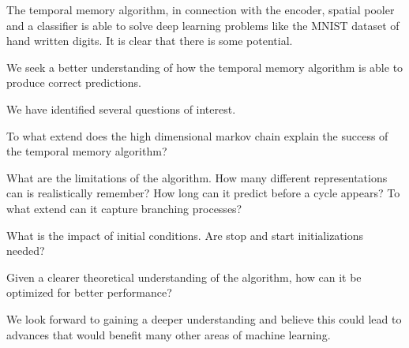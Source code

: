 \documentclass{article}
\begin{document}
The temporal memory algorithm, in connection with the encoder, spatial pooler and a classifier is able to solve deep learning problems like the MNIST dataset of hand written digits. It is clear that there is some potential.

We seek a better understanding of how the temporal memory algorithm is able to produce correct predictions.

We have identified several questions of interest.

\begin{list}{•}{•}
\item To what extend does the high dimensional markov chain explain the success of the temporal memory algorithm?
\item What are the limitations of the algorithm. How many different representations can is realistically remember? How long can it predict before a cycle appears? To what extend can it capture branching processes?
\item What is the impact of initial conditions. Are stop and start initializations needed?
\item Given a clearer theoretical understanding of the algorithm, how can it be optimized for better performance?
\end{list}

We look forward to gaining a deeper understanding and believe this could lead to advances that would benefit many other areas of machine learning.



\end{document}
